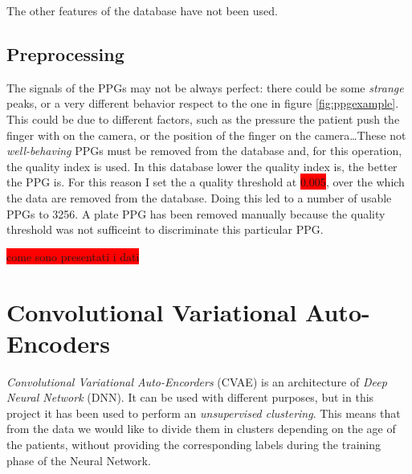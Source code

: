 \documentclass[12pt,a4paper,twocolumn]{article}
\begin{document}
			The other features of the database have not been used.
			\subsection{Preprocessing}
				The signals of the PPGs may not be always perfect: there could be some \emph{strange} peaks, or a very different behavior respect to the one in figure \ref{fig:ppgexample}.  This could be due to different factors, such as the pressure the patient push the finger with on the camera, or the position of the finger on the camera\dots These not \emph{well-behaving} PPGs must be removed from the database and, for this operation, the quality index is used. In this database lower the quality index is, the better the PPG is. For this reason I  set the a quality threshold at \colorbox{red}{0.005}, over the which the data are removed from the database. Doing this led to a number of usable PPGs to 3256. 
				A plate PPG has been removed manually because the quality threshold was not sufficeint to discriminate this particular PPG.
				
				\colorbox{red}{come sono presentati i dati}
				
		
			
		\section{Convolutional Variational Auto-Encoders}
			\label{vae_intro}
			\emph{Convolutional Variational Auto-Encorders} (CVAE) is an architecture of \emph{Deep Neural Network} (DNN). It can be used with different purposes, but in this project it has been used to perform an  \emph{unsupervised clustering}. This means that from the data we would like to divide them in clusters depending on the age of the patients, without providing the corresponding labels during the training phase of the Neural Network. 
			
\end{document}
